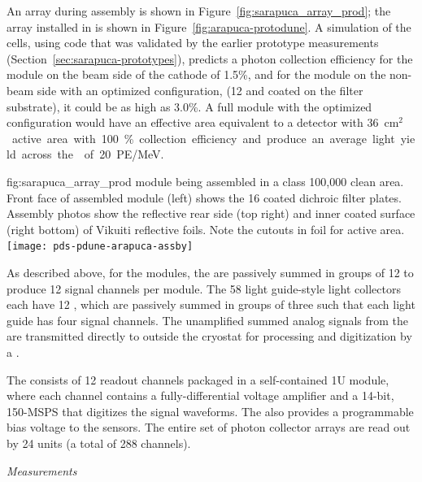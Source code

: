 An  array during assembly is shown in Figure~\ref{fig:sarapuca_array_prod}; the array installed in  is shown in Figure~\ref{fig:arapuca-protodune}. 
A simulation of the  cells, using code that was validated by the earlier prototype measurements (Section~\ref{sec:sarapuca-prototypes}), predicts a photon collection efficiency for the module on the beam side of the cathode of 1.5\%, and for the module on the non-beam side with an optimized configuration, (\num{12}  and  coated on the filter substrate), it could be as high as 3.0\%. A full  module with the optimized configuration would have an effective area equivalent to a detector with \SI{36}{cm$^2$} active area with 100\% collection efficiency and produce an average light yield across the  of \SI{20}{PE/MeV}.


\begin{dunefigure}{fig:sarapuca_array_prod}
{  module being assembled in a class 100,000 clean area.  Front face of assembled module (left) shows the 16 coated dichroic filter plates.  Assembly photos show the reflective rear side (top right) and inner coated surface (right bottom) of Vikuiti reflective foils.  Note the cutouts in foil for  active area.}
	\texttt{[image: pds-pdune-arapuca-assby]}
\end{dunefigure}


As described above, for the  modules, the  are passively summed in groups of 12 to produce 12 signal channels per module. The 58 light guide-style light collectors each have 12 , which are passively summed in groups of three such that each light guide has four signal channels. 
The unamplified summed analog signals from the  are transmitted directly to outside the cryostat for processing and digitization by a
.

The  consists of 12 readout channels packaged in  a self-contained 1U module, where each channel contains a fully-differential voltage amplifier and a \num{14}-bit, \num{150}-MSPS  that digitizes the  signal waveforms. The  also provides a programmable bias voltage to the sensors.
The entire set of photon collector arrays are read out by 24  units (a total of 288 channels).


\textit{  Measurements}
\label{sec:protodune-results}

